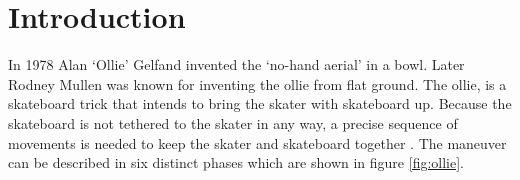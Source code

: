 \section{Introduction}\label{s_intro}
\noindent In 1978 Alan `Ollie' Gelfand invented the `no-hand aerial' in a bowl. Later Rodney Mullen was known for inventing the ollie from flat ground. The ollie, is a skateboard trick that intends to bring the skater with skateboard up. Because the skateboard is not tethered to the skater in any way, a precise sequence of movements is needed to keep the skater and skateboard together \cite{frederick_biomechanics_2006}. The maneuver can be described in six distinct phases which are shown in figure \ref{fig:ollie}. 

